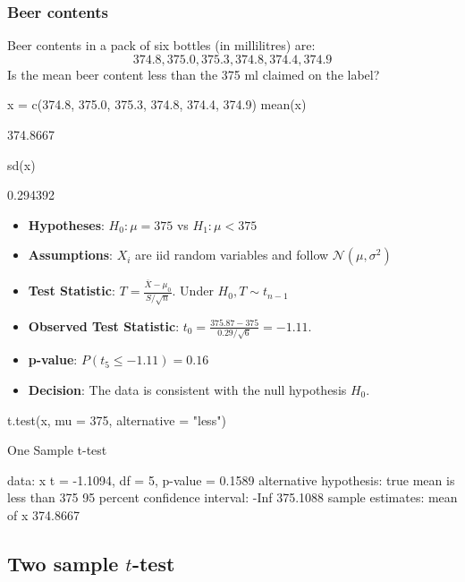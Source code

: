 \documentclass[a4paper]{article}\usepackage[]{graphicx}\usepackage[]{xcolor}
\begin{document}
\subsubsection{Beer contents}
Beer contents in a pack of six bottles (in millilitres) are:
\[
	374.8, 375.0, 375.3, 374.8, 374.4, 374.9
\]
Is the mean beer content less than the 375 ml claimed on the label?
\begin{Schunk}
\begin{Sinput}
x = c(374.8, 375.0, 375.3, 374.8, 374.4, 374.9)
mean(x)
\end{Sinput}
\begin{Soutput}
[1] 374.8667
\end{Soutput}
\begin{Sinput}
sd(x)
\end{Sinput}
\begin{Soutput}
[1] 0.294392
\end{Soutput}
\end{Schunk}
\begin{itemize}
	\item \textbf{Hypotheses}: \( H_0: \mu = 375 \) vs \( H_1: \mu < 375 \)
	\item \textbf{Assumptions}: \( X_i \) are iid random variables and follow \( \mathcal{N} (\mu,\sigma^2) \) 
	\item \textbf{Test Statistic}: \( T = \frac{\overline{X} - \mu_0}{S / \sqrt{n}} \). Under \( H_0, T \sim t_{n-1} \)   
	\item \textbf{Observed Test Statistic}: \( t_0 = \frac{375.87 - 375}{0.29 / \sqrt{6}} = -1.11 \).
	\item \textbf{p-value}: \( P(t_5 \leq -1.11) = 0.16 \)
	\item \textbf{Decision}: The data is consistent with the null hypothesis \( H_0 \).
\end{itemize}
\begin{Schunk}
\begin{Sinput}
t.test(x, mu = 375, alternative = "less")
\end{Sinput}
\begin{Soutput}

	One Sample t-test

data:  x
t = -1.1094, df = 5, p-value = 0.1589
alternative hypothesis: true mean is less than 375
95 percent confidence interval:
     -Inf 375.1088
sample estimates:
mean of x 
 374.8667 
\end{Soutput}
\end{Schunk}
\subsection{Two sample \( t \)-test}
\end{document}
